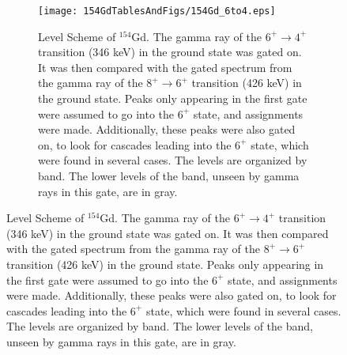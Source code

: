 \begin{landscape}
\begin{figure}[!]
    \centering
    \begin{subfigure}{1.4\textwidth}
    \texttt{[image: 154GdTablesAndFigs/154Gd\_6to4.eps]}
    \caption{\label{fig:154_6to4level}Level Scheme of $^{154}$Gd. The gamma ray of the $6^+\rightarrow4^+$ transition (346 keV) in the ground state was gated on. It was then compared with the gated spectrum from the gamma ray of the $8^+\rightarrow6^+$ transition (426 keV) in the ground state. Peaks only appearing in the first gate were assumed to go into the $6^+$ state, and assignments were made. Additionally, these peaks were also gated on, to look for cascades leading into the $6^+$ state, which were found in several cases. The levels are organized by band. The lower levels of the band, unseen by gamma rays in this gate, are in gray.}
    \end{subfigure}
    \label{fig:154_6to4}
    \end{figure}
    \end{landscape}
